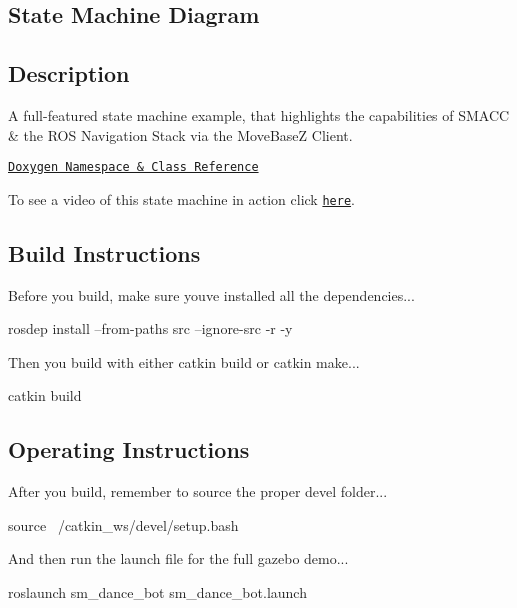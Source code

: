 \subsection*{State Machine Diagram}



\subsection*{Description}

A full-\/featured state machine example, that highlights the capabilities of S\+M\+A\+CC \& the R\+OS Navigation Stack via the Move\+BaseZ Client.~\newline


\href{https://reelrbtx.github.io/SMACC_Documentation/master/html/namespacesm__dance__bot.html}{\tt Doxygen Namespace \& Class Reference}

To see a video of this state machine in action click \href{https://www.youtube.com/watch?v=9iyX_x05d3Q&t=7s}{\tt here}.

\subsection*{Build Instructions}

Before you build, make sure you\textquotesingle{}ve installed all the dependencies...


\begin{DoxyCode}
rosdep install --from-paths src --ignore-src -r -y 
\end{DoxyCode}


Then you build with either catkin build or catkin make...


\begin{DoxyCode}
catkin build
\end{DoxyCode}
 \subsection*{Operating Instructions}

After you build, remember to source the proper devel folder...


\begin{DoxyCode}
source ~/catkin\_ws/devel/setup.bash
\end{DoxyCode}


And then run the launch file for the full gazebo demo...


\begin{DoxyCode}
roslaunch sm\_dance\_bot sm\_dance\_bot.launch
\end{DoxyCode}



